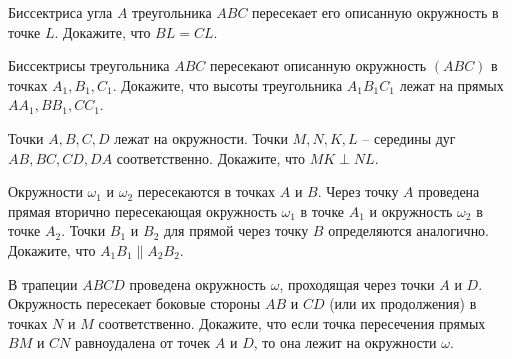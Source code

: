\begin{tasks}
    \item Биссектриса угла $A$ треугольника $ABC$ пересекает его описанную окружность в точке $L$. Докажите, что $BL = CL$.    %

    \item Биссектрисы треугольника $ABC$ пересекают описанную окружность $(ABC)$ в точках $A_1, B_1, C_1$. Докажите, что высоты треугольника $A_1B_1C_1$ лежат на прямых $AA_1, BB_1, CC_1$. %

    \item Точки $A, B, C, D$ лежат на окружности. Точки $M , N , K, L$ -- середины дуг $AB, BC, CD, DA$ соответственно. Докажите, что $M K \perp N L$.

    \item {}\label{lem:fuss}{Окружности $\omega_1$ и $\omega_2$ пересекаются в точках $A$ и $B$. Через точку $A$ проведена прямая вторично пересекающая окружность $\omega_1$ в точке $A_1$ и окружность $\omega_2$ в точке $A_2$. Точки $B_1$ и $B_2$ для прямой через точку $B$ определяются аналогично. Докажите, что $A_1B_1 \parallel A_2B_2$.}   
    



    \item В трапеции $ABCD$ проведена окружность $\omega$, проходящая через точки $A$ и $D$. Окружность пересекает боковые стороны $AB$ и $CD$ (или их продолжения) в точках $N$ и $M$ соответственно. Докажите, что если точка пересечения прямых $BM$ и $CN$ равноудалена от точек $A$ и $D$, то она лежит на окружности $\omega$. 


\end{tasks}
